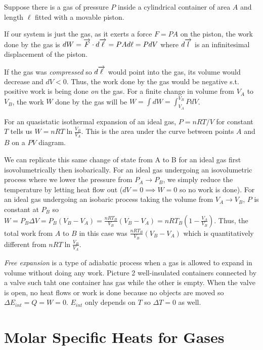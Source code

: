 \begin{example}
    Suppose there is a gas of pressure $P$ inside a cylindrical container of area $A$ and length $\ell$ fitted with a movable piston.

    If our system is just the gas, as it exerts a force $F=PA$ on the piston, the work done by the gas is $dW = \overrightarrow{F}\cdot d\overrightarrow{\ell} = PAd\ell = PdV$ where $d\overrightarrow{l}$ is an infinitesimal displacement of the piston.

    If the gas was \emph{compressed} so $d\overrightarrow{\ell}$ would point into the gas, its volume would decrease and $dV<0$. Thus, the work done by the gas would be negative s.t. positive work is being done \emph{on} the gas. For a finite change in volume from $V_A$ to $V_B$, the work $W$ done by the gas will be $W = \int dW = \int_{V_A}^{V_B}PdV$.

    For an quasistatic isothermal expansion of an ideal gas, $P=nRT/V$ for constant $T$ tells us $W = nRT\ln\frac{V_B}{V_A}.$ This is the area under the curve between points $A$ and $B$ on a $PV$ diagram.

    We can replicate this same change of state from A to B for an ideal gas first isovolumetrically then isobarically. For an ideal gas undergoing an isovolumetric process where we lower the pressure from $P_A \to P_B$, we simply reduce the temperature by letting heat flow out ($dV = 0 \implies W = 0$ so no work is done). For an ideal gas undergoing an isobaric process taking the volume from $V_A \to V_B$, $P$ is constant at $P_B$ so $W = P_B\Delta V = P_B(V_B-V_A) = \frac{nRT_B}{V_B}(V_B-V_A) = nRT_B(1-\frac{V_A}{V_B})$. Thus, the total work from $A$ to $B$ in this case was $\frac{nRT_B}{V_B}(V_B-V_A)$ which is quantitatively different from $nRT\ln\frac{V_B}{V_A}$.
\end{example}
\begin{definition}
    \emph{Free expansion} is a type of adiabatic process when a gas is allowed to expand in volume without doing any work. Picture 2 well-insulated containers connected by a valve such taht one container has gas while the other is empty. When the valve is open, no heat flows or work is done because no objects are moved so $\Delta E_{int} = Q = W = 0$. $E_{int}$ only depends on $T$ so $\Delta T = 0$ as well.
\end{definition}

\section{Molar Specific Heats for Gases}

